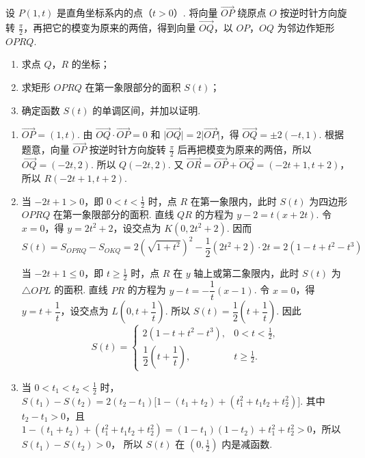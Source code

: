 \documentclass[UTF8,a4paper,oneside,11pt]{ctexbook}
\begin{document}
\begin{problem}
设 \(P(1, t)\) 是直角坐标系内的点（\(t > 0\)）. 将向量 \(\overrightarrow{OP}\) 绕原点 \(O\) 按逆时针方向旋转 \(\frac{\pi}{2}\)，再把它的模变为原来的两倍，得到向量 \(\overrightarrow{OQ}\)，以 \(OP\)，\(OQ\) 为邻边作矩形 \(OPRQ\).
\begin{enumerate}
\item 求点 \(Q\)，\(R\) 的坐标；
\item 求矩形 \(OPRQ\) 在第一象限部分的面积 \(S(t)\)；
\item 确定函数 \(S(t)\) 的单调区间，并加以证明.
\end{enumerate}
\end{problem}

\begin{solution}
\begin{enumerate}
\item \(\overrightarrow{OP} = (1,t)\). 由 \(\overrightarrow{OQ}\cdot\overrightarrow{OP}=0\) 和 \(\lvert\overrightarrow{OQ}\rvert=2\lvert\overrightarrow{OP}\rvert\)，得 \(\overrightarrow{OQ}=\pm 2(-t,1)\). 根据题意，向量 \(\overrightarrow{OP}\) 按逆时针方向旋转 \(\frac{\pi}{2}\) 后再把模变为原来的两倍，所以 \(\overrightarrow{OQ}=(-2t,2)\).
所以 \(Q(-2t,2)\). 又 \(\overrightarrow{OR} = \overrightarrow{OP} + \overrightarrow{OQ} = (-2t+1, t+2)\)，所以 \(R(-2t+1,t+2)\).

\item 当 \(-2t+1>0\)，即 \(0<t<\frac12\) 时，点 \(R\) 在第一象限内，此时 \(S(t)\) 为四边形 \(OPRQ\) 在第一象限部分的面积.
直线 \(QR\) 的方程为 \(y-2=t(x+2t)\). 令 \(x=0\)，得 \(y=2t^2+2\)，设交点为 \(K(0,2t^2+2)\). 因而
\[
S(t)=S_{OPRQ}-S_{OKQ}=2\left(\sqrt{1+t^2}\right)^2-\frac12(2t^2+2)\cdot 2t=2(1-t+t^2-t^3)
\]

当 \(-2t+1\le0\)，即 \(t\ge\frac12\) 时，点 \(R\) 在 \(y\) 轴上或第二象限内，此时 \(S(t)\) 为 \(\triangle OPL\) 的面积.
直线 \(PR\) 的方程为 \(y-t=-\dfrac{1}{t}(x-1)\).
令 \(x=0\)，得 \(y=t+\dfrac1t\)，设交点为 \(L\!\left(0,t+\dfrac1t\right)\). 所以 \(S(t)=\dfrac12\left(t+\dfrac1t\right)\).
因此
\[
S(t)=
\begin{cases}
2(1-t+t^2-t^3), & 0<t<\frac12,\\
\dfrac12\left(t+\dfrac1t\right), & t\ge\frac12.
\end{cases}
\]

\item 当 \(0<t_1<t_2<\frac12\) 时，
\(S(t_1)-S(t_2)=2(t_2-t_1)\bigl[1-(t_1+t_2)+(t_1^2+t_1t_2+t_2^2)\bigr]\). 其中 \(t_2-t_1>0\)，且
\(1-(t_1+t_2)+(t_1^2+t_1t_2+t_2^2)=(1-t_1)(1-t_2)+t_1^2+t_2^2>0\)，所以 \(S(t_1)-S(t_2)>0\)，
所以 \(S(t)\) 在 \((0,\frac12)\) 内是减函数.


\end{enumerate}
\end{solution}
\end{document}
